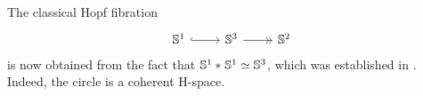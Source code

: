 \begin{rmk}
The classical Hopf fibration
\begin{equation*}
\begin{tikzcd}
\sphere{1} \arrow[r,hookrightarrow] & \sphere{3} \arrow[r,->>] & \sphere{2}
\end{tikzcd}
\end{equation*}
is now obtained from the fact that ${\mathbb{S}^{1}}\ast_{}{\mathbb{S}^{1}}\simeq \mathbb{S}^{3}$, which was established in \cite{BruneriePhD}. Indeed, the circle is a coherent H-space.
\end{rmk}
